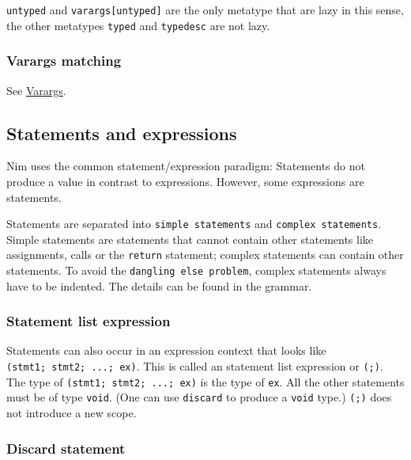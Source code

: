 \texttt{untyped} and \texttt{varargs{[}untyped{]}} are the only metatype
that are lazy in this sense, the other metatypes \texttt{typed} and
\texttt{typedesc} are not lazy.

\hypertarget{varargs-matching}{%
\subsubsection{Varargs matching}\label{varargs-matching}}

See \protect\hyperlink{types-varargs}{Varargs}.

\hypertarget{statements-and-expressions}{%
\subsection{Statements and
expressions}\label{statements-and-expressions}}

Nim uses the common statement/expression paradigm: Statements do not
produce a value in contrast to expressions. However, some expressions
are statements.

Statements are separated into \texttt{simple\ statements} and
\texttt{complex\ statements}. Simple statements are statements that
cannot contain other statements like assignments, calls or the
\texttt{return} statement; complex statements can contain other
statements. To avoid the \texttt{dangling\ else\ problem}, complex
statements always have to be indented. The details can be found in the
grammar.

\hypertarget{statement-list-expression}{%
\subsubsection{Statement list
expression}\label{statement-list-expression}}

Statements can also occur in an expression context that looks like
\texttt{(stmt1;\ stmt2;\ ...;\ ex)}. This is called an statement list
expression or \texttt{(;)}. The type of
\texttt{(stmt1;\ stmt2;\ ...;\ ex)} is the type of \texttt{ex}. All the
other statements must be of type \texttt{void}. (One can use
\texttt{discard} to produce a \texttt{void} type.) \texttt{(;)} does not
introduce a new scope.

\hypertarget{discard-statement}{%
\subsubsection{Discard statement}\label{discard-statement}}

